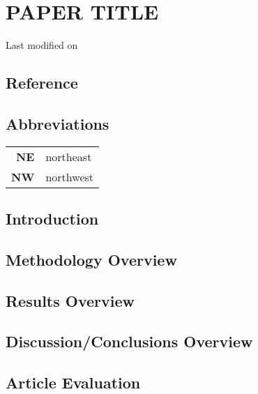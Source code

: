 \chapter{PAPER TITLE}

\begin{flushright}
Last modified on \filemodprintdate{\jobname}
\end{flushright}

\section*{Reference}

\section*{Abbreviations}
\begin{table}[ht!]
\begin{tabular}{r l}
\textbf{NE}	& northeast		\\
\textbf{NW}	& northwest
\end{tabular}
\end{table}

\section*{Introduction}
\blindtext

\section{Methodology Overview}
\blindtext

\section{Results Overview}
\blindtext

\section{Discussion/Conclusions Overview}
\blindtext

\section*{Article Evaluation}
\blindtext